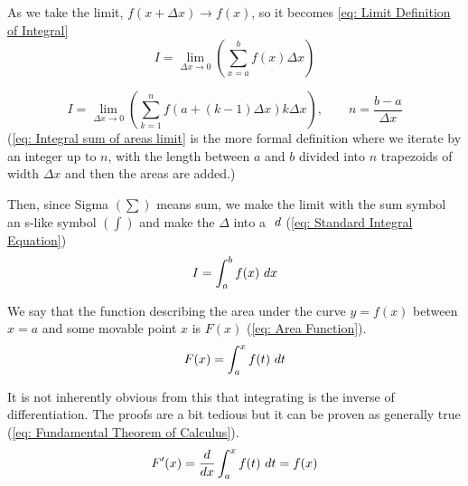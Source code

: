 \documentclass[main.tex]{subfiles}
\begin{document}
            \newpage

            As we take the limit, $f(x + \Delta x) \to f(x)$, so it becomes \eqref{eq: Limit Definition of Integral}
            \begin{equation}
                I = \lim_{\Delta x \to 0}\left(\sum_{x = a}^b f\left(x\right) \Delta x\right)
                \label{eq: Limit Definition of Integral}
            \end{equation}

            \begin{equation}
                I = \lim_{\Delta x \to 0}\left(\sum_{k = 1}^n f\left(a +(k-1)\Delta x\right) k\Delta x\right), \qquad n = \frac{b-a}{\Delta x}
                \label{eq: Integral sum of areas limit}
            \end{equation}
            (\eqref{eq: Integral sum of areas limit} is the more formal definition where we iterate by an integer up to $n$, with the length between $a$ and $b$ divided into $n$ trapezoids of width $\Delta x$ and then the areas are added.)
            \vspace{1em}

            Then, since Sigma $\left(\sum\right)$ means sum, we make the limit with the sum symbol an s-like symbol $(\int)$ and make the $\Delta$ into a $\, \, d$ (\eqref{eq: Standard Integral Equation}) 
            \begin{equation}
                I = \int_a^b f(x) \, \, d x
                \label{eq: Standard Integral Equation}
            \end{equation}

            We say that the function describing the area under the curve $y=f(x)$ between $x=a$ and some movable point $x$ is $F(x)$ (\eqref{eq: Area Function}).
            \begin{equation}
                F(x) = \int_a^x f(t)\, \, d t
                \label{eq: Area Function}
            \end{equation}

            \vspace*{1em}
            It is not inherently obvious from this that integrating is the inverse of differentiation. The proofs are a bit tedious but it can be proven as generally true (\eqref{eq: Fundamental Theorem of Calculus}).
            \begin{equation}
                F'(x) = \frac{d}{dx}\int_a^x f(t)\, \, d t = f(x)
                \label{eq: Fundamental Theorem of Calculus}
            \end{equation}
\end{document}
